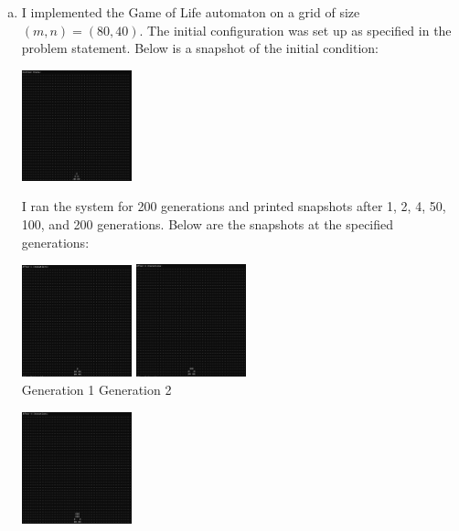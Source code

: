 \documentclass{article}
\begin{document}
\begin{enumerate}[a)]
    \item I implemented the Game of Life automaton on a grid of size $(m,n) = (80,40)$. The initial configuration was set up as specified in the problem statement. Below is a snapshot of the initial condition:
    \begin{center}
        \includegraphics[width=0.25\textwidth]{OpHw1_3aInit.png}
    \end{center}
    I ran the system for 200 generations and printed snapshots after 1, 2, 4, 50, 100, and 200 generations. Below are the snapshots at the specified generations:
    \begin{center}
        \includegraphics[width=0.25\textwidth]{OpHw1_3a1.png}    
        \includegraphics[width=0.25\textwidth]{OpHw1_3a2.png} \\
        Generation 1 \hspace{3cm} Generation 2
    \end{center}
    \begin{center}
        \includegraphics[width=0.25\textwidth]{OpHw1_3a4.png}

\end{center}
\end{enumerate}
\end{document}
